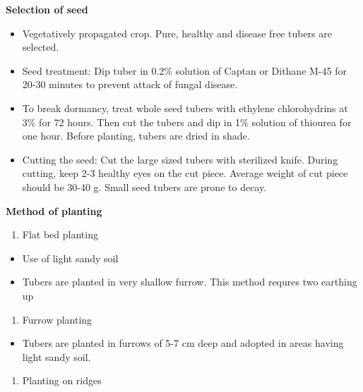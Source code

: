 \documentclass[
  openany]{book}
\providecommand{\tightlist}{%
  \setlength{\itemsep}{0pt}\setlength{\parskip}{0pt}}
\begin{document}
\textbf{Selection of seed}

\begin{itemize}
\tightlist
\item
  Vegetatively propagated crop. Pure, healthy and disease free tubers are selected.
\item
  Seed treatment: Dip tuber in 0.2\% solution of Captan or Dithane M-45 for 20-30 minutes to prevent attack of fungal disease.
\item
  To break dormancy, treat whole seed tubers with ethylene chlorohydrins at 3\% for 72 hours. Then cut the tubers and dip in 1\% solution of thiourea for one hour. Before planting, tubers are dried in shade.
\item
  Cutting the seed: Cut the large sized tubers with sterilized knife. During cutting, keep 2-3 healthy eyes on the cut piece. Average weight of cut piece should be 30-40 g. Small seed tubers are prone to decay.
\end{itemize}

\textbf{Method of planting}

\begin{enumerate}
\def\labelenumi{\arabic{enumi}.}
\tightlist
\item
  Flat bed planting
\end{enumerate}

\begin{itemize}
\tightlist
\item
  Use of light sandy soil
\item
  Tubers are planted in very shallow furrow. This method requres two earthing up
\end{itemize}

\begin{enumerate}
\def\labelenumi{\arabic{enumi}.}
\setcounter{enumi}{1}
\tightlist
\item
  Furrow planting
\end{enumerate}

\begin{itemize}
\tightlist
\item
  Tubers are planted in furrows of 5-7 cm deep and adopted in areas having light sandy soil.
\end{itemize}

\begin{enumerate}
\def\labelenumi{\arabic{enumi}.}
\setcounter{enumi}{2}
\tightlist
\item
  Planting on ridges
\end{enumerate}
\end{document}
